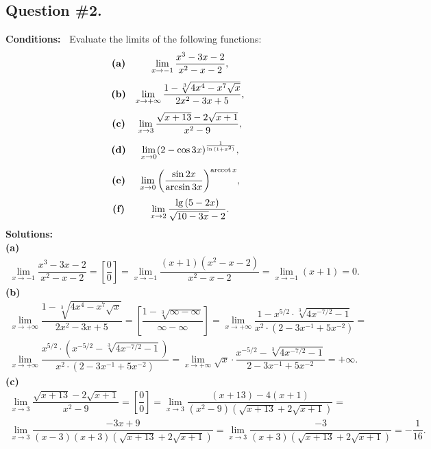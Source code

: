 \subsection*{\center Question \#2.}
{\bf Conditions:~} 
Evaluate the limits of the following functions:
$$
\begin{array}{cc}
\text{\bf(a)} & \lim\limits_{x\rightarrow-1}\dfrac{x^3-3x-2}{x^2-x-2}, \\[12pt]
\text{\bf(b)} & \lim\limits_{x\rightarrow+\infty}\dfrac{1-\sqrt[3]{4x^4-x^7\sqrt{x}}}{2x^2-3x+5}, \\[12pt]
\text{\bf(c)} & \lim\limits_{x\rightarrow3}\dfrac{\sqrt{x+13}-2\sqrt{x+1}}{x^2-9}, \\[12pt]
\text{\bf(d)} & \lim\limits_{x\rightarrow0}({2-\cos{3x}})^{\frac{1}{\ln{(1+x^2)}}}, \\[12pt]
\text{\bf(e)} & \lim\limits_{x\rightarrow0}{\left(\dfrac{\sin{2x}}{\arcsin{3x}}\right)}^{\operatorname{arccot} x}, \\[12pt]
\text{\bf(f)} & \lim\limits_{x\rightarrow2}\dfrac{\lg{(5-2x)}}{\sqrt{10-3x}-2}.
\end{array}
$$
{\bf Solutions:}\\
{\bf\flushleft (a)}
$$
\begin{array}{l}
\lim\limits_{x\rightarrow-1}\dfrac{x^3-3x-2}{x^2-x-2}= 
\left[\dfrac{0}{0}\right] = 
\lim\limits_{x\rightarrow-1}\dfrac{(x+1)(x^2-x-2)}{x^2-x-2} = \lim\limits_{x\rightarrow-1}(x+1) = 0.
\end{array}
$$
\vspace{0.2cm}
{\bf\flushleft (b)}
$$
\begin{array}{l}
\lim\limits_{x\rightarrow+\infty}\dfrac{1-\sqrt[3]{4x^4-x^7\sqrt{x}}}{2x^2-3x+5} =
\left[\dfrac{1-\sqrt[3]{\infty-\infty}}{\infty-\infty}\right] =
\lim\limits_{x\rightarrow+\infty}\dfrac{1-x^{5/2}\cdot\sqrt[3]{4x^{-7/2}-1}}{x^2\cdot(2-3x^{-1}+5x^{-2})} = \\ [15pt]
\lim\limits_{x\rightarrow+\infty}\dfrac{x^{5/2}\cdot(x^{-5/2}-\sqrt[3]{4x^{-7/2}-1})}{x^2\cdot(2-3x^{-1}+5x^{-2})} =
\lim\limits_{x\rightarrow+\infty}\sqrt{x}\cdot\dfrac{x^{-5/2}-\sqrt[3]{4x^{-7/2}-1}}{2-3x^{-1}+5x^{-2}} = +\infty.
\end{array}
$$
\vspace{0.2cm}
{\bf\flushleft (c)}
$$
\begin{array}{l}
\lim\limits_{x\rightarrow3}\dfrac{\sqrt{x+13}-2\sqrt{x+1}}{x^2-9} =
\left[\dfrac{0}{0}\right] =
\lim\limits_{x\rightarrow3}\dfrac{(x+13)-4(x+1)}{(x^2-9)(\sqrt{x+13}+2\sqrt{x+1})} = \\ [15pt]
\lim\limits_{x\rightarrow3}\dfrac{-3x+9}{(x-3)(x+3)(\sqrt{x+13}+2\sqrt{x+1})} =
\lim\limits_{x\rightarrow3}\dfrac{-3}{(x+3)(\sqrt{x+13}+2\sqrt{x+1})} = -\dfrac{1}{16}.
\end{array}
$$

